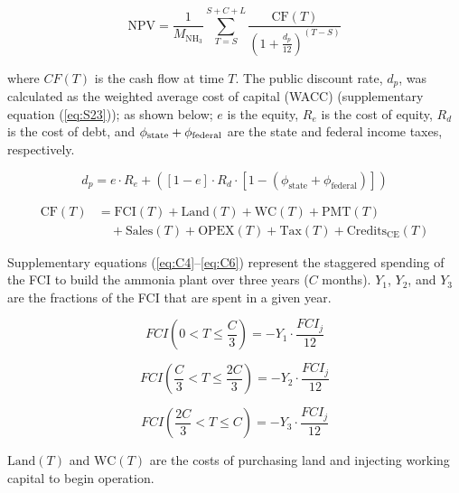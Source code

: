 \documentclass{article}
\begin{document}
\begin{equation}
\text{NPV} = \frac{1}{M_{\text{NH}_3}} \sum_{T=S}^{S+C+L} \frac{\text{CF}(T)}{(1 + \frac{d_p}{12})^{(T-S)}}
\label{eq:S23}
\end{equation}

where \( CF(T) \) is the cash flow at time \( T \). The public discount rate, \( d_p \), was calculated as the weighted average cost of capital (WACC) (supplementary equation (\ref{eq:S23})); as shown below; \( e \) is the equity, \( R_e \) is the cost of equity, \( R_d \) is the cost of debt, and \( \phi\textsubscript{state} + \phi\textsubscript{federal} \) are the state and federal income taxes, respectively.

\begin{equation}
d_p = e \cdot R_e + \left( [1-e] \cdot R_d \cdot [1-(\phi_{\text{state}} + \phi_{\text{federal}})] \right)
\label{eq:C2}
\end{equation}

\begin{equation}
\begin{aligned}
\text{CF}(T) &= \text{FCI}(T) + \text{Land}(T) + \text{WC}(T) + \text{PMT}(T) \\
&\quad + \text{Sales}(T) + \text{OPEX}(T) + \text{Tax}(T) + \text{Credits}_{\text{CE}}(T)
\end{aligned}
\label{eq:C3}
\end{equation}

Supplementary equations (\ref{eq:C4}–\ref{eq:C6}) represent the staggered spending of the FCI to build the ammonia plant over three years (\( C \) months). \( Y_1 \), \( Y_2 \), and \( Y_3 \) are the fractions of the FCI that are spent in a given year.

\begin{equation}
FCI(0<T \leq \frac{C}{3}) = -Y_1 \cdot \frac{FCI_j}{12}
\label{eq:C4}
\end{equation}

\begin{equation}
FCI\left(\frac{C}{3}<T \leq \frac{2C}{3}\right) = -Y_2 \cdot \frac{FCI_j}{12}
\label{eq:C5}
\end{equation}

\begin{equation}
FCI\left(\frac{2C}{3}<T \leq C\right) = -Y_3 \cdot \frac{FCI_j}{12}
\label{eq:C6}
\end{equation}

\( \text{Land}(T) \) and \( \text{WC}(T) \) are the costs of purchasing land and injecting working capital to begin operation.
\end{document}

